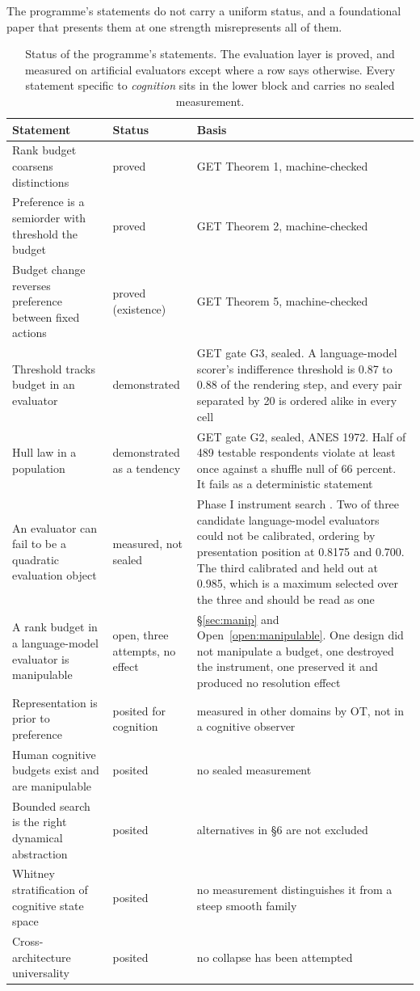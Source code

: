 \documentclass[11pt,letterpaper]{article}
\theoremstyle{plain}
\theoremstyle{definition}
\begin{document}
The programme's statements do not carry a uniform status, and a foundational
paper that presents them at one strength misrepresents all of them.

\begin{table}[!ht]
\caption{Status of the programme's statements. The evaluation layer is proved,
and measured on artificial evaluators except where a row says otherwise. Every
statement specific to \emph{cognition} sits in the lower block and carries no
sealed measurement.}
\label{tab:status}
\centering\footnotesize
\begin{tabular}{@{}p{} p{} p{}@{}}
\toprule
\textbf{Statement} & \textbf{Status} & \textbf{Basis} \\
\midrule
Rank budget coarsens distinctions & proved & GET Theorem 1, machine-checked \\
Preference is a semiorder with threshold the budget & proved & GET Theorem 2, machine-checked \\
Budget change reverses preference between fixed actions & proved (existence) & GET Theorem 5, machine-checked \\
Threshold tracks budget in an evaluator & demonstrated & GET gate G3, sealed. A language-model scorer's indifference threshold is 0.87 to 0.88 of the rendering step, and every pair separated by 20 is ordered alike in every cell \\
Hull law in a population & demonstrated as a tendency & GET gate G2, sealed, ANES 1972. Half of 489 testable respondents violate at least once against a shuffle null of 66 percent. It fails as a deterministic statement \\
An evaluator can fail to be a quadratic evaluation object & measured, not sealed & Phase I instrument search \cite{c1}. Two of three candidate language-model evaluators could not be calibrated, ordering by presentation position at 0.8175 and 0.700. The third calibrated and held out at 0.985, which is a maximum selected over the three and should be read as one \\
A rank budget in a language-model evaluator is manipulable & open, three attempts, no effect & \S\ref{sec:manip} and Open~\ref{open:manipulable}. One design did not manipulate a budget, one destroyed the instrument, one preserved it and produced no resolution effect \\
Representation is prior to preference & posited for cognition & measured in other domains by OT, not in a cognitive observer \\
Human cognitive budgets exist and are manipulable & posited & no sealed measurement \\
Bounded search is the right dynamical abstraction & posited & alternatives in \S6 are not excluded \\
Whitney stratification of cognitive state space & posited & no measurement distinguishes it from a steep smooth family \\
Cross-architecture universality & posited & no collapse has been attempted \\
\bottomrule
\end{tabular}
\end{table}
\end{document}
